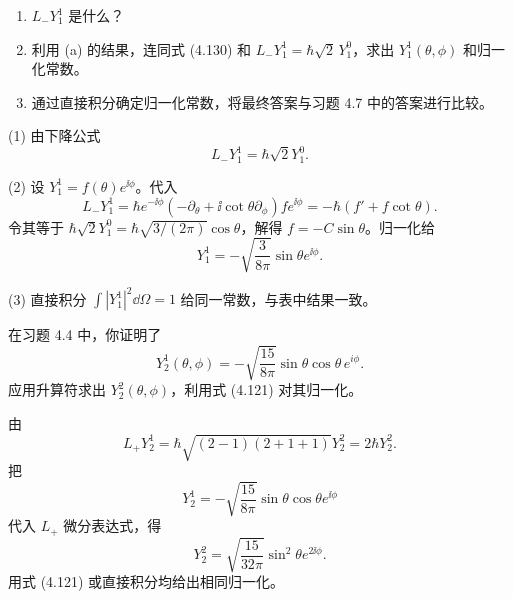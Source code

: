 \begin{question}
\begin{enumerate}
\item $L_-Y_1^1$ 是什么？
\item 利用 (a) 的结果，连同式 (4.130) 和 $L_-Y_1^1=\hbar\sqrt2\,Y_1^0$，求出 $Y_1^1(\theta,\phi)$ 和归一化常数。
\item 通过直接积分确定归一化常数，将最终答案与习题 4.7 中的答案进行比较。
\end{enumerate}

\par\smallskip
{}

\end{question}
\begin{solution}

(1) 由下降公式
\[
L_-Y_1^1=\hbar\sqrt{2}Y_1^0.
\]

(2) 设 $Y_1^1=f(\theta)e^{\ii\phi}$。代入
\[
L_-Y_1^1=\hbar e^{-\ii\phi}\left(-\partial_\theta+\ii\cot\theta\partial_\phi\right)f e^{\ii\phi}
=-\hbar(f'+f\cot\theta).
\]
令其等于 $\hbar\sqrt2Y_1^0=\hbar\sqrt{3/(2\pi)}\cos\theta$，解得 $f=-C\sin\theta$。归一化给
\[
Y_1^1=-\sqrt{\frac{3}{8\pi}}\sin\theta e^{\ii\phi}.
\]

(3) 直接积分 $\int|Y_1^1|^2\dd\Omega=1$ 给同一常数，与表中结果一致。

\end{solution}

\begin{question}
在习题 4.4 中，你证明了
\[
Y_2^1(\theta,\phi)=-\sqrt{\frac{15}{8\pi}}\sin\theta\cos\theta\,e^{i\phi}.
\]
应用升算符求出 $Y_2^2(\theta,\phi)$，利用式 (4.121) 对其归一化。

\par\smallskip
{}

\end{question}
\begin{solution}

由
\[
L_+Y_2^1=\hbar\sqrt{(2-1)(2+1+1)}Y_2^2=2\hbar Y_2^2.
\]
把
\[
Y_2^1=-\sqrt{\frac{15}{8\pi}}\sin\theta\cos\theta e^{\ii\phi}
\]
代入 $L_+$ 微分表达式，得
\[
Y_2^2=\sqrt{\frac{15}{32\pi}}\sin^2\theta e^{2\ii\phi}.
\]
用式 (4.121) 或直接积分均给出相同归一化。

\end{solution}

